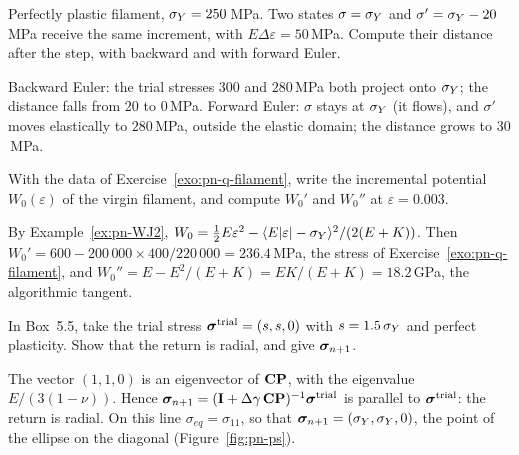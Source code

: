 \label{exo:pn-q-contract}
%
Perfectly plastic filament, $\sigma_{Y}=250$\,MPa. Two states $\sigma=\sigma_{Y}$ and
$\sigma'=\sigma_{Y}-20$\,MPa receive the same increment, with
$E\Delta\varepsilon=50$\,MPa. Compute their distance after the step, with
backward and with forward Euler.
\begin{solution}
Backward Euler: the trial stresses $300$ and $280$\,MPa both project onto
$\sigma_{Y}$; the distance falls from $20$ to $0$\,MPa. Forward Euler: $\sigma$ stays
at $\sigma_{Y}$ (it flows), and $\sigma'$ moves elastically to $280$\,MPa, outside
the elastic domain; the distance grows to $30$\,MPa.
\end{solution}

\label{exo:pn-q-potential}
%
With the data of Exercise~\ref{exo:pn-q-filament}, write the incremental
potential $W_0(\varepsilon)$ of the virgin filament, and compute $W_0'$ and
$W_0''$ at $\varepsilon=0.003$.
\begin{solution}
By Example~\ref{ex:pn-WJ2},
$W_0=\tfrac12E\varepsilon^2-\langle E|\varepsilon|-\sigma_{Y}\rangle^2/(2(E+K))$. Then
$W_0'=600-200\,000\times400/220\,000=236.4$\,MPa, the stress of
Exercise~\ref{exo:pn-q-filament}, and $W_0''=E-E^2/(E+K)=EK/(E+K)=18.2$\,GPa,
the algorithmic tangent.
\end{solution}

\label{exo:pn-q-biaxial}
%
In Box~5.5, take the trial stress $\bm{\sigma}^{\mathrm{trial}}=(s,s,0)$ with
$s=1.5\,\sigma_{Y}$ and perfect plasticity. Show that the return is radial, and
give $\bm{\sigma}_{n+1}$.
\begin{solution}
The vector $(1,1,0)$ is an eigenvector of $\mathbf{C}\mathbf{P}$, with the
eigenvalue $E/(3(1-\nu))$. Hence
$\bm{\sigma}_{n+1}=(\mathbf{I}+\Delta\gamma\,\mathbf{C}\mathbf{P})^{-1}\bm{\sigma}^{\mathrm{trial}}$ is
parallel to $\bm{\sigma}^{\mathrm{trial}}$: the return is radial. On this line
$\sigma_{eq}=\sigma_{11}$, so that $\bm{\sigma}_{n+1}=(\sigma_{Y},\sigma_{Y},0)$, the point
of the ellipse on the diagonal (Figure~\ref{fig:pn-ps}).
\end{solution}

